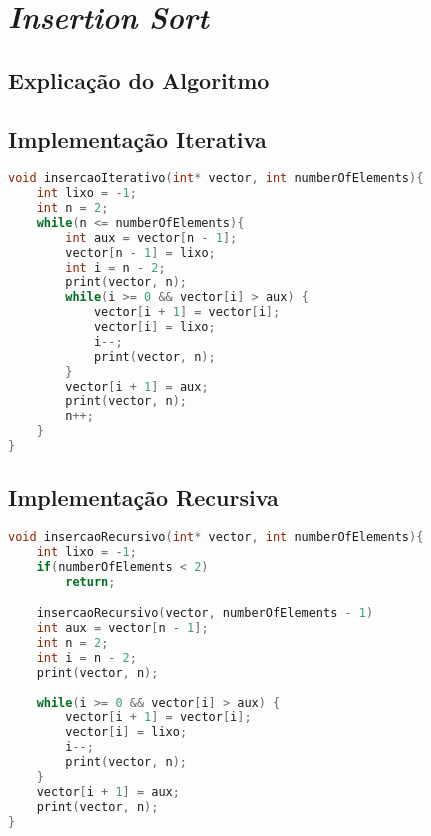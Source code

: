 \section{\textit{Insertion Sort}}

\subsection{Explicação do Algoritmo}
\subsection{Implementação Iterativa}
\begin{lstlisting}[language=C]
void insercaoIterativo(int* vector, int numberOfElements){
    int lixo = -1;
    int n = 2;
    while(n <= numberOfElements){
        int aux = vector[n - 1];
        vector[n - 1] = lixo;
        int i = n - 2;
        print(vector, n);
        while(i >= 0 && vector[i] > aux) {
            vector[i + 1] = vector[i];
            vector[i] = lixo;
            i--;
            print(vector, n);
        }
        vector[i + 1] = aux;
        print(vector, n);
        n++;
    }
}

\end{lstlisting}

\subsection{Implementação Recursiva}
\begin{lstlisting}[language=C]
void insercaoRecursivo(int* vector, int numberOfElements){
    int lixo = -1;
    if(numberOfElements < 2)
        return;

    insercaoRecursivo(vector, numberOfElements - 1)
    int aux = vector[n - 1];
    int n = 2;
    int i = n - 2;
    print(vector, n);
    
    while(i >= 0 && vector[i] > aux) {
        vector[i + 1] = vector[i];
        vector[i] = lixo;
        i--;
        print(vector, n);
    }
    vector[i + 1] = aux;
    print(vector, n);
}
\end{lstlisting}